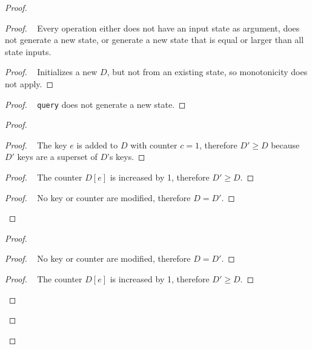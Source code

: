 \documentclass[11pt, oneside]{article}   	%
\begin{document}
\begin{proof}
	\begin{proof}
		\pfsketch~ Every operation either does not have an input state as argument, does not generate a new state, or generate a new state that is equal or larger than all state inputs.
		\begin{proof}
			\pf~ Initializes a new $D$, but not from an existing state, so monotonicity does not apply.
		\end{proof}
		
		\begin{proof}
			\pf~ \texttt{query} does not generate a new state.
		\end{proof}
		
		\begin{proof}
			\begin{proof}
				\pf~ The key $e$ is added to $D$ with counter $c=1$, therefore $D' \geq D$ because $D'$ keys are a superset of $D$'s keys.
			\end{proof}
			
			\begin{proof}
				\pf~ The counter $D[e]$ is increased by 1, therefore $D' \geq D$.
			\end{proof}
			
			\begin{proof}
				\pf~ No key or counter are modified, therefore $D=D'$.
			\end{proof}
		\end{proof}
		
		\begin{proof}
			\begin{proof}
				\pf~ No key or counter are modified, therefore $D=D'$.
			\end{proof}
			
			\begin{proof}
				\pf~ The counter $D[e]$ is increased by 1, therefore $D' \geq D$.
			\end{proof}
			

\end{proof}
\end{proof}
\end{proof}
\end{document}
